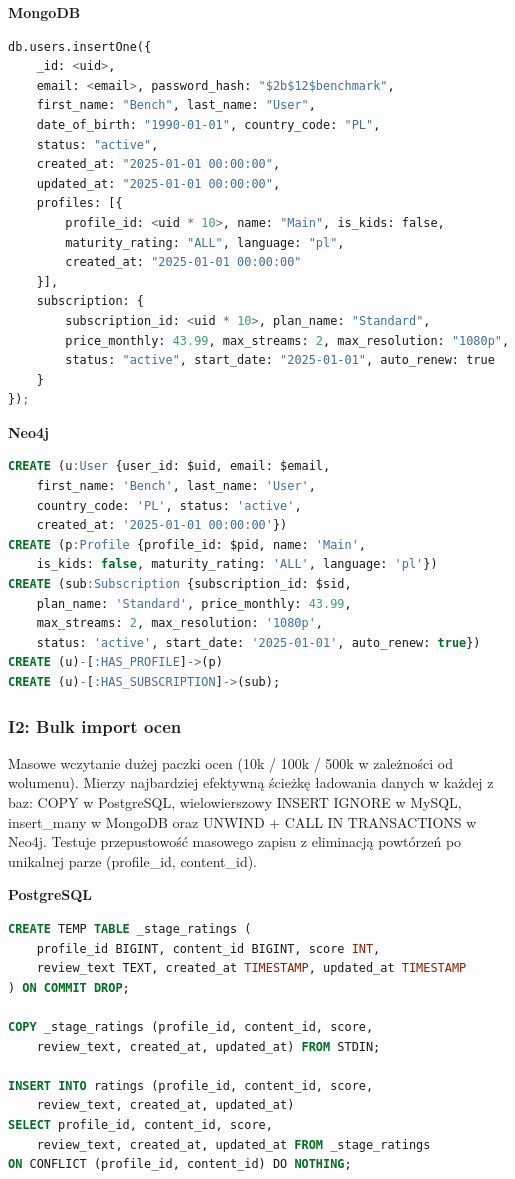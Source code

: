 \textbf{MongoDB}
\begin{lstlisting}[language=Python]
db.users.insertOne({
    _id: <uid>,
    email: <email>, password_hash: "$2b$12$benchmark",
    first_name: "Bench", last_name: "User",
    date_of_birth: "1990-01-01", country_code: "PL",
    status: "active",
    created_at: "2025-01-01 00:00:00",
    updated_at: "2025-01-01 00:00:00",
    profiles: [{
        profile_id: <uid * 10>, name: "Main", is_kids: false,
        maturity_rating: "ALL", language: "pl",
        created_at: "2025-01-01 00:00:00"
    }],
    subscription: {
        subscription_id: <uid * 10>, plan_name: "Standard",
        price_monthly: 43.99, max_streams: 2, max_resolution: "1080p",
        status: "active", start_date: "2025-01-01", auto_renew: true
    }
});
\end{lstlisting}

\textbf{Neo4j}
\begin{lstlisting}[language=SQL]
CREATE (u:User {user_id: $uid, email: $email,
    first_name: 'Bench', last_name: 'User',
    country_code: 'PL', status: 'active',
    created_at: '2025-01-01 00:00:00'})
CREATE (p:Profile {profile_id: $pid, name: 'Main',
    is_kids: false, maturity_rating: 'ALL', language: 'pl'})
CREATE (sub:Subscription {subscription_id: $sid,
    plan_name: 'Standard', price_monthly: 43.99,
    max_streams: 2, max_resolution: '1080p',
    status: 'active', start_date: '2025-01-01', auto_renew: true})
CREATE (u)-[:HAS_PROFILE]->(p)
CREATE (u)-[:HAS_SUBSCRIPTION]->(sub);
\end{lstlisting}


\subsubsection{I2: Bulk import ocen}

Masowe wczytanie dużej paczki ocen (10k / 100k / 500k w zależności od wolumenu).
Mierzy najbardziej efektywną ścieżkę ładowania danych w każdej z baz: COPY
w PostgreSQL, wielowierszowy INSERT IGNORE w MySQL, insert\_many w MongoDB
oraz UNWIND + CALL IN TRANSACTIONS w Neo4j. Testuje przepustowość masowego
zapisu z eliminacją powtórzeń po unikalnej parze (profile\_id, content\_id).

\textbf{PostgreSQL}
\begin{lstlisting}[language=SQL]
CREATE TEMP TABLE _stage_ratings (
    profile_id BIGINT, content_id BIGINT, score INT,
    review_text TEXT, created_at TIMESTAMP, updated_at TIMESTAMP
) ON COMMIT DROP;

COPY _stage_ratings (profile_id, content_id, score,
    review_text, created_at, updated_at) FROM STDIN;

INSERT INTO ratings (profile_id, content_id, score,
    review_text, created_at, updated_at)
SELECT profile_id, content_id, score,
    review_text, created_at, updated_at FROM _stage_ratings
ON CONFLICT (profile_id, content_id) DO NOTHING;
\end{lstlisting}

